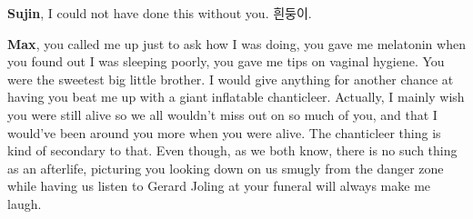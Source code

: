 {\bfseries Sujin}, I could not have done this without you. 흰둥이.

{\bfseries Max}, you called me up just to ask how I was doing, you gave me melatonin when you found out I was sleeping poorly, you gave me tips on vaginal hygiene. You were the sweetest big little brother. I would give anything for another chance at having you beat me up with a giant inflatable chanticleer. Actually, I mainly wish you were still alive so we all wouldn't miss out on so much of you, and that I would've been around you more when you were alive. The chanticleer thing is kind of secondary to that. Even though, as we both know, there is no such thing as an afterlife, picturing you looking down on us smugly from the danger zone while having us listen to Gerard Joling at your funeral will always make me laugh.
